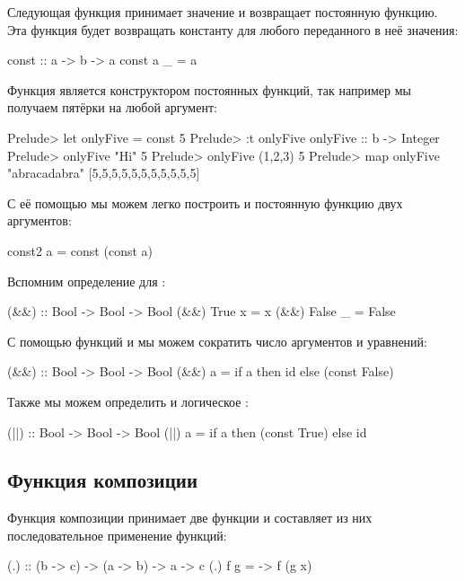 Следующая функция  принимает значение и возвращает
постоянную функцию. Эта функция будет возвращать константу
для любого переданного в неё значения:

\begin{code}
const :: a -> b -> a
const a _ = a
\end{code}

Функция  является конструктором постоянных
функций, так например мы получаем пятёрки на любой аргумент:

\begin{code}
Prelude> let onlyFive = const 5
Prelude> :t onlyFive 
onlyFive :: b -> Integer
Prelude> onlyFive "Hi"
5
Prelude> onlyFive (1,2,3)
5
Prelude> map onlyFive "abracadabra"
[5,5,5,5,5,5,5,5,5,5,5]
\end{code}

С её помощью мы можем легко построить и постоянную
функцию двух аргументов:

\begin{code}
const2 a = const (const a)
\end{code}

Вспомним определение для \In{&&}:

\begin{code}
(&&) :: Bool -> Bool -> Bool
(&&) True   x  = x
(&&) False  _  = False  
\end{code}

С помощью функций  и  мы можем сократить число 
аргументов и уравнений:

\begin{code}
(&&) :: Bool -> Bool -> Bool
(&&) a = if a then id else (const False)
\end{code}

Также мы можем определить и логическое :

\begin{code}
(||) :: Bool -> Bool -> Bool
(||) a = if a then (const True) else id
\end{code}

\subsection{Функция композиции}

Функция композиции принимает две функции и составляет
из них последовательное применение функций:

\begin{code}
(.) :: (b -> c) -> (a -> b) -> a -> c
(.) f g = \x -> f (g x)
\end{code}

